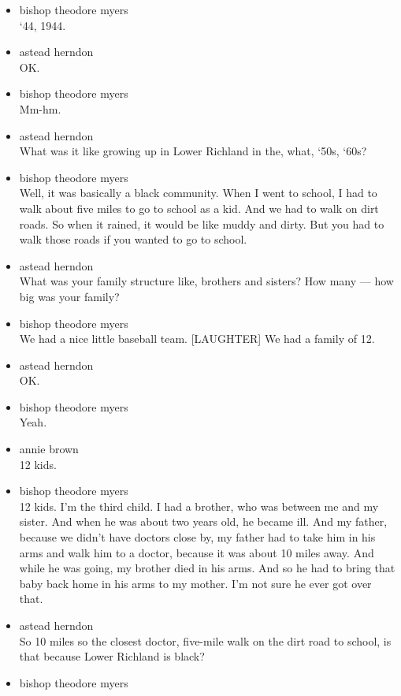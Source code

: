 \begin{itemize}
\item
  bishop theodore myers\\
  `44, 1944.
\item
  astead herndon\\
  OK.
\item
  bishop theodore myers\\
  Mm-hm.
\item
  astead herndon\\
  What was it like growing up in Lower Richland in the, what, `50s,
  `60s?
\item
  bishop theodore myers\\
  Well, it was basically a black community. When I went to school, I had
  to walk about five miles to go to school as a kid. And we had to walk
  on dirt roads. So when it rained, it would be like muddy and dirty.
  But you had to walk those roads if you wanted to go to school.
\item
  astead herndon\\
  What was your family structure like, brothers and sisters? How many
  --- how big was your family?
\item
  bishop theodore myers\\
  We had a nice little baseball team. {[}LAUGHTER{]} We had a family of
  12.
\item
  astead herndon\\
  OK.
\item
  bishop theodore myers\\
  Yeah.
\item
  annie brown\\
  12 kids.
\item
  bishop theodore myers\\
  12 kids. I'm the third child. I had a brother, who was between me and
  my sister. And when he was about two years old, he became ill. And my
  father, because we didn't have doctors close by, my father had to take
  him in his arms and walk him to a doctor, because it was about 10
  miles away. And while he was going, my brother died in his arms. And
  so he had to bring that baby back home in his arms to my mother. I'm
  not sure he ever got over that.
\item
  astead herndon\\
  So 10 miles so the closest doctor, five-mile walk on the dirt road to
  school, is that because Lower Richland is black?
\item
  bishop theodore myers\\

\end{itemize}
